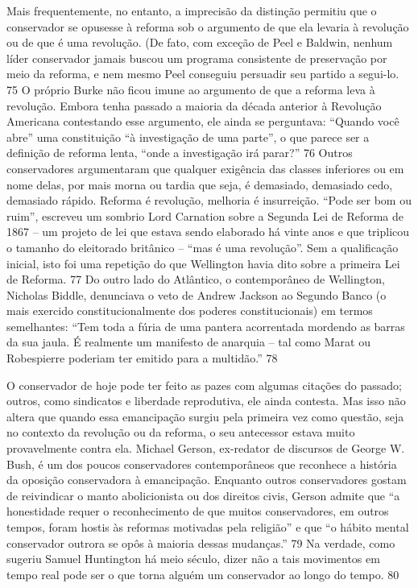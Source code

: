 Mais frequentemente, no entanto, a imprecisão da distinção permitiu que o conservador se opusesse à reforma sob o argumento de que ela levaria à revolução ou de que é uma revolução. (De fato, com exceção de Peel e Baldwin, nenhum líder conservador jamais buscou um programa consistente de preservação por meio da reforma, e nem mesmo Peel conseguiu persuadir seu partido a segui-lo.
 {\color{blue} 75}  
 O próprio Burke não ficou imune ao argumento de que a reforma leva à revolução. Embora tenha passado a maioria da década anterior à Revolução Americana contestando esse argumento, ele ainda se perguntava: “Quando você abre” uma constituição “à investigação de uma parte”, o que parece ser a definição de reforma lenta, “onde a investigação irá parar?”
 {\color{blue} 76}  
Outros conservadores argumentaram que qualquer exigência das classes inferiores ou em nome delas, por mais morna ou tardia que seja, é demasiado, demasiado cedo, demasiado rápido. Reforma é revolução, melhoria é insurreição. “Pode ser bom ou ruim”, escreveu um sombrio Lord Carnation sobre a Segunda Lei de Reforma de 1867 – um projeto de lei que estava sendo elaborado há vinte anos e que triplicou o tamanho do eleitorado britânico – “mas é uma revolução”. Sem a qualificação inicial, isto foi uma repetição do que Wellington havia dito sobre a primeira Lei de Reforma.
 {\color{blue} 77}  
Do outro lado do Atlântico, o contemporâneo de Wellington, Nicholas Biddle, denunciava o veto de Andrew Jackson ao Segundo Banco (o mais exercido constitucionalmente dos poderes constitucionais) em termos semelhantes: “Tem toda a fúria de uma pantera acorrentada mordendo as barras da sua jaula. É realmente um manifesto de anarquia – tal como Marat ou Robespierre poderiam ter emitido para a multidão.”
 {\color{blue} 78}  

 
\par
 
O conservador de hoje pode ter feito as pazes com algumas citações do passado; outros, como sindicatos e liberdade reprodutiva, ele ainda contesta. Mas isso não altera que quando essa emancipação surgiu pela primeira vez como questão, seja no contexto da revolução ou da reforma, o seu antecessor estava muito provavelmente contra ela. Michael Gerson, ex-redator de discursos de George W. Bush, é um dos poucos conservadores contemporâneos que reconhece a história da oposição conservadora à emancipação. Enquanto outros conservadores gostam de reivindicar o manto abolicionista ou dos direitos civis, Gerson admite que “a honestidade requer o reconhecimento de que muitos conservadores, em outros tempos, foram hostis às reformas motivadas pela religião” e que “o hábito mental conservador outrora se opôs à maioria dessas mudanças.”
 {\color{blue} 79}  
Na verdade, como sugeriu Samuel Huntington há meio século, dizer não a tais movimentos em tempo real pode ser o que torna alguém um conservador ao longo do tempo.
 {\color{blue} 80}  

